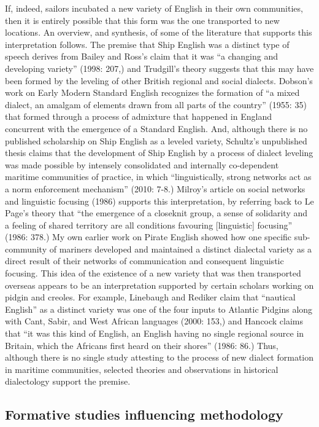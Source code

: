 If, indeed, sailors incubated a new variety of English in their own communities, then it is entirely possible that this form was the one transported to new locations. An overview, and synthesis, of some of the literature that supports this interpretation follows. The premise that Ship English was a distinct type of speech derives from Bailey and Ross’s claim that it was “a changing and developing variety” (1998: 207,) and Trudgill’s theory suggests that this may have been formed by the leveling of other British regional and social dialects. Dobson’s work on Early Modern Standard English recognizes the formation of “a mixed dialect, an amalgam of elements drawn from all parts of the country” (1955: 35) that formed through a process of admixture that happened in England concurrent with the emergence of a Standard English. And, although there is no published scholarship on Ship English as a leveled variety, Schultz’s unpublished thesis claims that the development of Ship English by a process of dialect leveling was made possible by intensely consolidated and internally co-dependent maritime communities of practice, in which “linguistically, strong networks act as a norm enforcement mechanism” (2010: 7-8.) Milroy’s article on social networks and linguistic focusing (1986) supports this interpretation, by referring back to Le Page’s theory that “the emergence of a closeknit group, a sense of solidarity and a feeling of shared territory are all conditions favouring [linguistic] focusing” (1986: 378.) My own earlier work on Pirate English \citep{Delgado2013} showed how one specific sub-community of mariners developed and maintained a distinct dialectal variety as a direct result of their networks of communication and consequent linguistic focusing. This idea of the existence of a new variety that was then transported overseas appears to be an interpretation supported by certain scholars working on pidgin and creoles.  For example, Linebaugh and Rediker claim that “nautical English” as a distinct variety was one of the four inputs to Atlantic Pidgins along with Cant, Sabir, and West African languages (2000: 153,) and Hancock claims that “it was this kind of English, an English having no single regional source in Britain, which the Africans first heard on their shores” (1986: 86.) Thus, although there is no single study attesting to the process of new dialect formation in maritime communities, selected theories and observations in historical dialectology support the premise. 

\subsection{{Formative} {studies} {influencing} {methodology}}%

